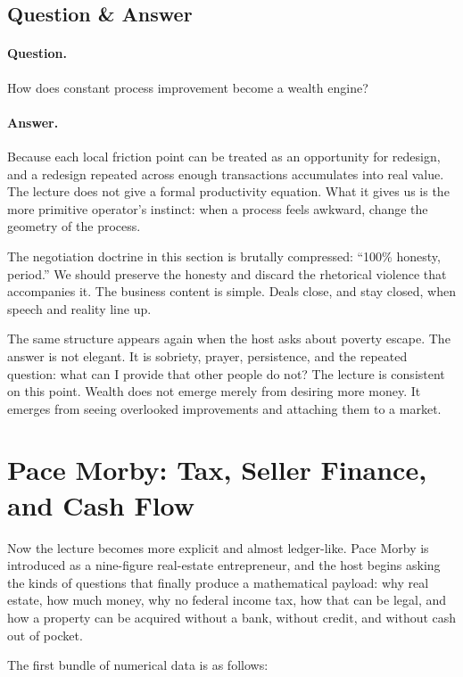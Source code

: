 \subsection{Question \& Answer}

\paragraph{Question.} How does constant process improvement become a wealth engine?

\paragraph{Answer.} Because each local friction point can be treated as an opportunity for redesign, and a redesign repeated across enough transactions accumulates into real value. The lecture does not give a formal productivity equation. What it gives us is the more primitive operator's instinct: when a process feels awkward, change the geometry of the process.

The negotiation doctrine in this section is brutally compressed: ``100\% honesty, period.'' We should preserve the honesty and discard the rhetorical violence that accompanies it. The business content is simple. Deals close, and stay closed, when speech and reality line up.

The same structure appears again when the host asks about poverty escape. The answer is not elegant. It is sobriety, prayer, persistence, and the repeated question: what can I provide that other people do not? The lecture is consistent on this point. Wealth does not emerge merely from desiring more money. It emerges from seeing overlooked improvements and attaching them to a market.

\section{Pace Morby: Tax, Seller Finance, and Cash Flow}

Now the lecture becomes more explicit and almost ledger-like. Pace Morby is introduced as a nine-figure real-estate entrepreneur, and the host begins asking the kinds of questions that finally produce a mathematical payload: why real estate, how much money, why no federal income tax, how that can be legal, and how a property can be acquired without a bank, without credit, and without cash out of pocket.

The first bundle of numerical data is as follows:

